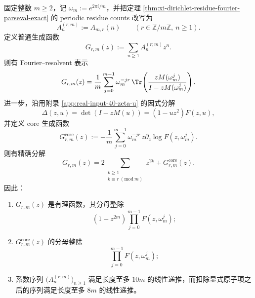 \begin{theorem}\label{thm:xi-time-part50dc-periodic-residue-rational-core-octic}
固定整数 \(m\ge 2\)，记 \(\omega_m:=e^{2\pi i/m}\)，并把定理 \ref{thm:xi-dirichlet-residue-fourier-parseval-exact} 的 periodic residue counts 改写为
\[
A_n^{(r;m)}:=A_{m,r}(n)
\qquad (r\in\mathbb Z/m\mathbb Z,\ n\ge 1).
\]
定义普通生成函数
\[
G_{r,m}(z):=\sum_{n\ge 1}A_n^{(r;m)}z^n.
\]
则有 Fourier--resolvent 表示
\[
G_{r,m}(z)
=
\frac1m\sum_{j=0}^{m-1}\omega_m^{-jr}\,
\Tr\!\left(\frac{zM(\omega_m^j)}{I-zM(\omega_m^j)}\right).
\]
进一步，沿用附录 \ref{app:real-input-40-zeta-u} 的因式分解
\[
\Delta(z,u)=\det(I-zM(u))=(1-uz^2)F(z,u),
\]
并定义 core 生成函数
\[
G_{r,m}^{\mathrm{core}}(z)
:=
-\frac1m\sum_{j=0}^{m-1}\omega_m^{-jr}\,
z\partial_z\log F(z,\omega_m^j).
\]
则有精确分解
\[
G_{r,m}(z)
=
2\sum_{\substack{k\ge 1\\ k\equiv r\ (\mathrm{mod}\ m)}}z^{2k}
+G_{r,m}^{\mathrm{core}}(z).
\]
因此：
\begin{enumerate}
  \item \(G_{r,m}(z)\) 是有理函数，其分母整除
  \[
  (1-z^{2m})\prod_{j=0}^{m-1}F(z,\omega_m^j);
  \]
  \item \(G_{r,m}^{\mathrm{core}}(z)\) 的分母整除
  \[
  \prod_{j=0}^{m-1}F(z,\omega_m^j);
  \]
  \item 系数序列 \(\bigl(A_n^{(r;m)}\bigr)_{n\ge 1}\) 满足长度至多 \(10m\) 的线性递推，而扣除显式原子项之后的序列满足长度至多 \(8m\) 的线性递推。
\end{enumerate}
\end{theorem}
